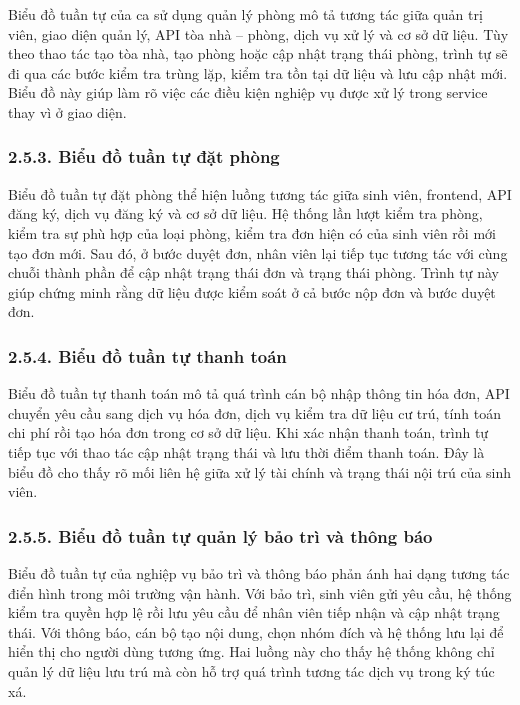 \documentclass[12pt]{article}
\begin{document}
Biểu đồ tuần tự của ca sử dụng quản lý phòng mô tả tương tác giữa quản trị viên, giao diện quản lý, API tòa nhà -- phòng, dịch vụ xử lý và cơ sở dữ liệu. Tùy theo thao tác tạo tòa nhà, tạo phòng hoặc cập nhật trạng thái phòng, trình tự sẽ đi qua các bước kiểm tra trùng lặp, kiểm tra tồn tại dữ liệu và lưu cập nhật mới. Biểu đồ này giúp làm rõ việc các điều kiện nghiệp vụ được xử lý trong service thay vì ở giao diện.

\subsubsection*{2.5.3. Biểu đồ tuần tự đặt phòng}

Biểu đồ tuần tự đặt phòng thể hiện luồng tương tác giữa sinh viên, frontend, API đăng ký, dịch vụ đăng ký và cơ sở dữ liệu. Hệ thống lần lượt kiểm tra phòng, kiểm tra sự phù hợp của loại phòng, kiểm tra đơn hiện có của sinh viên rồi mới tạo đơn mới. Sau đó, ở bước duyệt đơn, nhân viên lại tiếp tục tương tác với cùng chuỗi thành phần để cập nhật trạng thái đơn và trạng thái phòng. Trình tự này giúp chứng minh rằng dữ liệu được kiểm soát ở cả bước nộp đơn và bước duyệt đơn.

\subsubsection*{2.5.4. Biểu đồ tuần tự thanh toán}

Biểu đồ tuần tự thanh toán mô tả quá trình cán bộ nhập thông tin hóa đơn, API chuyển yêu cầu sang dịch vụ hóa đơn, dịch vụ kiểm tra dữ liệu cư trú, tính toán chi phí rồi tạo hóa đơn trong cơ sở dữ liệu. Khi xác nhận thanh toán, trình tự tiếp tục với thao tác cập nhật trạng thái và lưu thời điểm thanh toán. Đây là biểu đồ cho thấy rõ mối liên hệ giữa xử lý tài chính và trạng thái nội trú của sinh viên.

\subsubsection*{2.5.5. Biểu đồ tuần tự quản lý bảo trì và thông báo}

Biểu đồ tuần tự của nghiệp vụ bảo trì và thông báo phản ánh hai dạng tương tác điển hình trong môi trường vận hành. Với bảo trì, sinh viên gửi yêu cầu, hệ thống kiểm tra quyền hợp lệ rồi lưu yêu cầu để nhân viên tiếp nhận và cập nhật trạng thái. Với thông báo, cán bộ tạo nội dung, chọn nhóm đích và hệ thống lưu lại để hiển thị cho người dùng tương ứng. Hai luồng này cho thấy hệ thống không chỉ quản lý dữ liệu lưu trú mà còn hỗ trợ quá trình tương tác dịch vụ trong ký túc xá.
\end{document}
